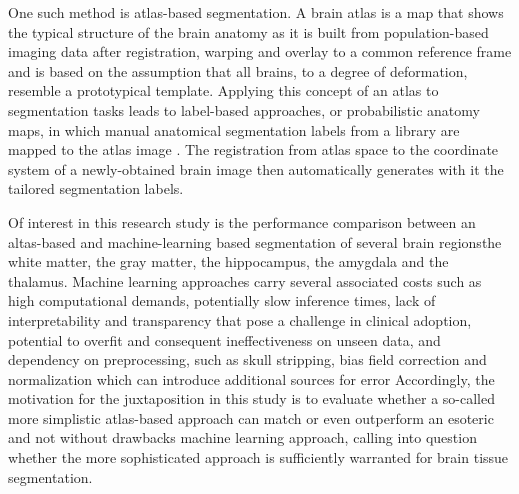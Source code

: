 One such method is atlas-based segmentation. A brain atlas is a map that shows the typical structure of the brain anatomy as it is built from population-based imaging data after registration, warping and overlay to a common reference frame and is based on the assumption that all brains, to a degree of deformation, resemble a prototypical template. Applying this concept of an atlas to segmentation tasks leads to label-based approaches, or probabilistic anatomy maps, in which manual anatomical segmentation labels from a library are mapped to the atlas image \cite{b7}. The registration from atlas space to the coordinate system of a newly-obtained brain image then automatically generates with it the tailored segmentation labels.

Of interest in this research study is the performance comparison between an altas-based and machine-learning based segmentation of several brain regions\textemdash{}the white matter, the gray matter, the hippocampus, the amygdala and the thalamus. Machine learning approaches carry several associated costs such as high computational demands, potentially slow inference times, lack of interpretability and transparency that pose a challenge in clinical adoption, potential to overfit and consequent ineffectiveness on unseen data, and dependency on preprocessing, such as skull stripping, bias field correction and normalization which can introduce additional sources for error \cite{b8,b9} Accordingly, the motivation for the juxtaposition in this study is to evaluate whether a so-called more simplistic atlas-based approach can match or even outperform an esoteric and not without drawbacks machine learning approach, calling into question whether the more sophisticated approach is sufficiently warranted for brain tissue segmentation.



















